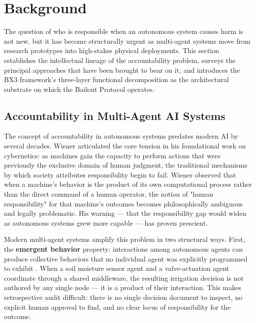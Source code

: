 \section{Background}
\label{sec:background}

The question of who is responsible when an autonomous system causes harm is not new, but it has become structurally urgent as multi-agent systems move from research prototypes into high-stakes physical deployments. This section establishes the intellectual lineage of the accountability problem, surveys the principal approaches that have been brought to bear on it, and introduces the BX3 framework's three-layer functional decomposition as the architectural substrate on which the Bailout Protocol operates.

\subsection{Accountability in Multi-Agent AI Systems}

The concept of accountability in autonomous systems predates modern AI by several decades. Wiener \cite{wiener1948} articulated the core tension in his foundational work on cybernetics: as machines gain the capacity to perform actions that were previously the exclusive domain of human judgment, the traditional mechanisms by which society attributes responsibility begin to fail. Wiener observed that when a machine's behavior is the product of its own computational process rather than the direct command of a human operator, the notion of "human responsibility" for that machine's outcomes becomes philosophically ambiguous and legally problematic. His warning — that the responsibility gap would widen as autonomous systems grew more capable — has proven prescient.

Modern multi-agent systems amplify this problem in two structural ways. First, the \textbf{emergent behavior} property: interactions among autonomous agents can produce collective behaviors that no individual agent was explicitly programmed to exhibit \cite{bansal2019}. When a soil moisture sensor agent and a valve-actuation agent coordinate through a shared middleware, the resulting irrigation decision is not authored by any single node — it is a product of their interaction. This makes retrospective audit difficult: there is no single decision document to inspect, no explicit human approval to find, and no clear locus of responsibility for the outcome.

